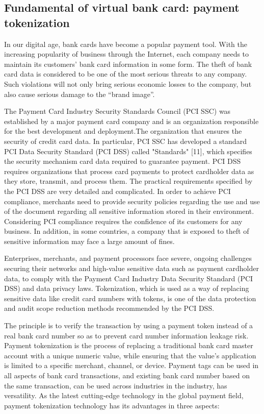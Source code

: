 \documentclass[journal]{IEEEtran}
\begin{document}
\subsection{Fundamental of virtual bank card: payment tokenization }
In our digital age, bank cards have become a popular payment tool. With the increasing popularity of business through the Internet, each company needs to maintain its customers' bank card information in some form. The theft of bank card data is considered to be one of the most serious threats to any company. Such violations will not only bring serious economic losses to the company, but also cause serious damage to the “brand image”.

The Payment Card Industry Security Standards Council (PCI SSC) was established by a major payment card company and is an organization responsible for the best development and deployment.The organization that ensures the security of credit card data. In particular, PCI SSC has developed a standard PCI Data Security Standard (PCI DSS) called "Standards" [11], which specifies the security mechanism card data required to guarantee payment. PCI DSS requires organizations that process card payments to protect cardholder data as they store, transmit, and process them. The practical requirements specified by the PCI DSS are very detailed and complicated. In order to achieve PCI compliance, merchants need to provide security policies regarding the use and use of the document regarding all sensitive information stored in their environment. Considering PCI compliance requires the confidence of its customers for any business. In addition, in some countries, a company that is exposed to theft of sensitive information may face a large amount of fines.

Enterprises, merchants, and payment processors face severe, ongoing challenges securing their networks and high-value sensitive data such as payment cardholder data, to comply with the Payment Card Industry Data Security Standard (PCI DSS) and data privacy laws. Tokenization, which is used as a way of replacing sensitive data like credit card numbers with tokens, is one of the data protection and audit scope reduction methods recommended by the PCI DSS. 

The principle is to verify the transaction by using a payment token instead of a real bank card number so as to prevent card number information leakage risk. Payment tokenization is the process of replacing a traditional bank card master account with a unique numeric value, while ensuring that the value's application is limited to a specific merchant, channel, or device. Payment tags can be used in all aspects of bank card transactions, and existing bank card number based on the same transaction, can be used across industries in the industry, has versatility.
As the latest cutting-edge technology in the global payment field, payment tokenization technology has its advantages in three aspects:
\end{document}
